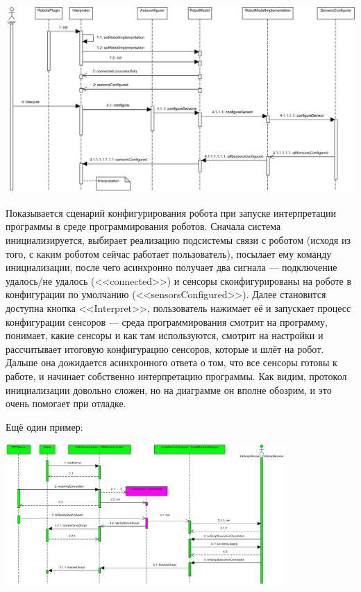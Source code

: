 \documentclass[a5paper]{article}
\begin{document}
\begin{center}
	\includegraphics[width=\textwidth]{sequenceDiagramExample.png}
\end{center}

Показывается сценарий конфигурирования робота при запуске интерпретации программы в среде программирования роботов. Сначала система инициализируется, выбирает реализацию подсистемы связи с роботом (исходя из того, с каким роботом сейчас работает пользователь), посылает ему команду инициализации, после чего асинхронно получает два сигнала --- подключение удалось/не удалось (<<connected>>) и сенсоры сконфигурированы на роботе в конфигурации по умолчанию (<<sensorsConfigured>>). Далее становится доступна кнопка <<Interpret>>, пользователь нажимает её и запускает процесс конфигурации сенсоров --- среда программирования смотрит на программу, понимает, какие сенсоры и как там используются, смотрит на настройки и рассчитывает итоговую конфигурацию сенсоров, которые и шлёт на робот. Дальше она дожидается асинхронного ответа о том, что все сенсоры готовы к работе, и начинает собственно интерпретацию программы. Как видим, протокол инициализации довольно сложен, но на диаграмме он вполне обозрим, и это очень помогает при отладке.

Ещё один пример:

\begin{center}
	\includegraphics[width=0.8\textwidth]{sequenceDiagramExample2.png}
\end{center}
\end{document}
